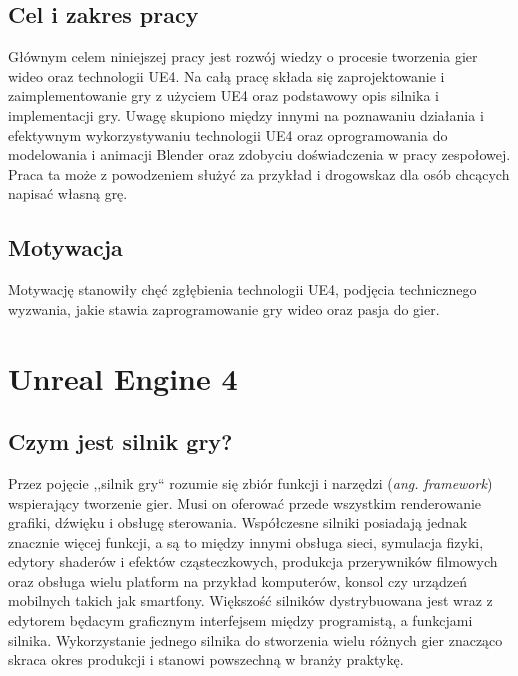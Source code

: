 \documentclass[multip]{SGGW-thesis}
\begin{document}
\section{Cel i zakres pracy}
Głównym celem niniejszej pracy jest rozwój wiedzy o procesie tworzenia gier wideo oraz technologii UE4.  Na całą pracę składa się zaprojektowanie i zaimplementowanie gry z użyciem UE4 oraz podstawowy opis silnika i implementacji gry. 
\newline \indent Uwagę skupiono między innymi na poznawaniu działania i efektywnym wykorzystywaniu technologii UE4 oraz oprogramowania do modelowania i animacji Blender oraz zdobyciu doświadczenia w pracy zespołowej.
Praca ta może z powodzeniem służyć za przykład i drogowskaz dla osób chcących napisać własną grę.

\section{Motywacja}
Motywację stanowiły chęć zgłębienia technologii UE4, podjęcia technicznego wyzwania, jakie stawia zaprogramowanie gry wideo oraz pasja do gier.
\chapter{Unreal Engine 4}
\section{Czym jest silnik gry?}
\label{czym-jest-silnik}
Przez pojęcie ,,silnik gry`` rozumie się zbiór funkcji i narzędzi ({\em ang. framework}) wspierający tworzenie gier. Musi on oferować przede wszystkim renderowanie grafiki, dźwięku i obsługę sterowania. Współczesne silniki posiadają jednak znacznie więcej funkcji, a są to między innymi obsługa sieci, symulacja fizyki, edytory shaderów i efektów cząsteczkowych, produkcja przerywników filmowych oraz obsługa wielu platform na przykład komputerów, konsol czy urządzeń mobilnych takich jak smartfony. Większość silników dystrybuowana jest wraz z edytorem będacym graficznym interfejsem między programistą, a funkcjami silnika. Wykorzystanie jednego silnika do stworzenia wielu różnych gier znacząco skraca okres produkcji i stanowi powszechną w branży praktykę\cite{learning-unreal}\cite{wiki-game-engine}.
\end{document}

